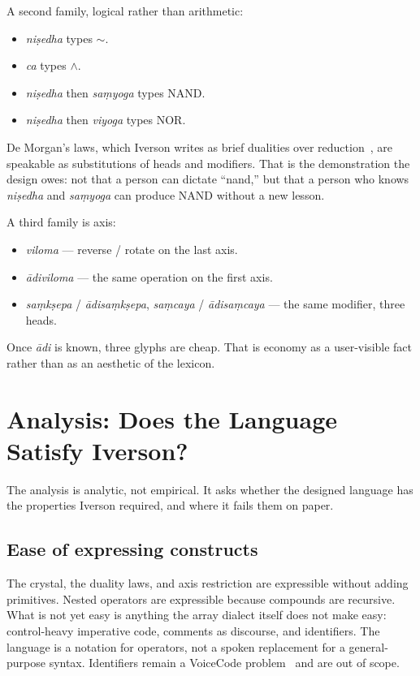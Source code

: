 \documentclass[manuscript, review, anonymous]{acmart}
\begin{document}
A second family, logical rather than arithmetic:

\begin{itemize}
\item \textit{ni{\d{s}}edha} types $\sim$.
\item \textit{ca} types $\wedge$.
\item \textit{ni{\d{s}}edha} then \textit{sa{\d{m}}yoga} types NAND.
\item \textit{ni{\d{s}}edha} then \textit{viyoga} types NOR.
\end{itemize}

De Morgan's laws, which Iverson writes as brief dualities over reduction~\cite{Iverson1980Notation}, are speakable as substitutions of heads and modifiers. That is the demonstration the design owes: not that a person can dictate ``nand,'' but that a person who knows \textit{ni{\d{s}}edha} and \textit{sa{\d{m}}yoga} can produce NAND without a new lesson.

A third family is axis:

\begin{itemize}
\item \textit{viloma} --- reverse / rotate on the last axis.
\item \textit{{\=a}diviloma} --- the same operation on the first axis.
\item \textit{sa{\d{m}}k{\d{s}}epa} / \textit{{\=a}disa{\d{m}}k{\d{s}}epa}, \textit{sa{\d{m}}caya} / \textit{{\=a}disa{\d{m}}caya} --- the same modifier, three heads.
\end{itemize}

Once \textit{{\=a}di} is known, three glyphs are cheap. That is economy as a user-visible fact rather than as an aesthetic of the lexicon.

\section{Analysis: Does the Language Satisfy Iverson?}
\label{sec:analysis}

The analysis is analytic, not empirical. It asks whether the designed language has the properties Iverson required, and where it fails them on paper.

\subsection{Ease of expressing constructs}

The crystal, the duality laws, and axis restriction are expressible without adding primitives. Nested operators are expressible because compounds are recursive. What is not yet easy is anything the array dialect itself does not make easy: control-heavy imperative code, comments as discourse, and identifiers. The language is a notation for operators, not a spoken replacement for a general-purpose syntax. Identifiers remain a VoiceCode problem~\cite{Desilets2006VoiceCode} and are out of scope.
\end{document}
